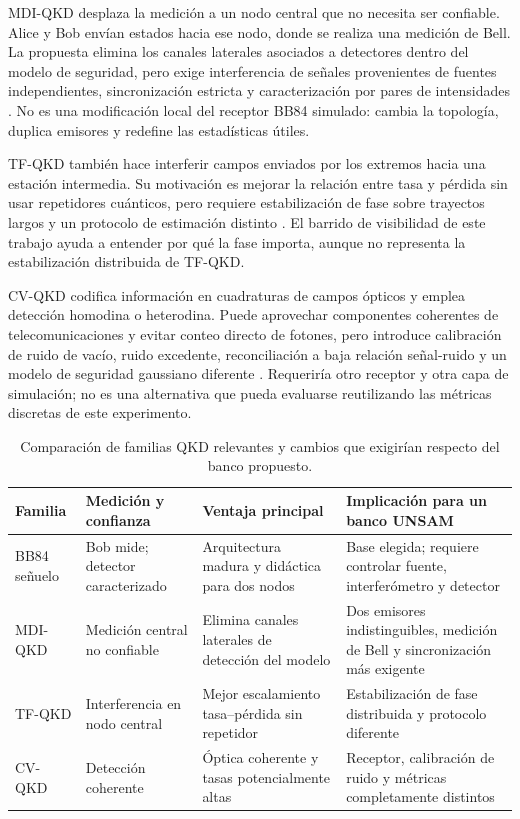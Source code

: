 MDI-QKD desplaza la medición a un nodo central que no necesita ser confiable. Alice y Bob envían estados hacia ese nodo, donde se realiza una medición de Bell. La propuesta elimina los canales laterales asociados a detectores dentro del modelo de seguridad, pero exige interferencia de señales provenientes de fuentes independientes, sincronización estricta y caracterización por pares de intensidades \cite{lo2012mdi}. No es una modificación local del receptor BB84 simulado: cambia la topología, duplica emisores y redefine las estadísticas útiles.

TF-QKD también hace interferir campos enviados por los extremos hacia una estación intermedia. Su motivación es mejorar la relación entre tasa y pérdida sin usar repetidores cuánticos, pero requiere estabilización de fase sobre trayectos largos y un protocolo de estimación distinto \cite{lucamarini2018tf}. El barrido de visibilidad de este trabajo ayuda a entender por qué la fase importa, aunque no representa la estabilización distribuida de TF-QKD.

CV-QKD codifica información en cuadraturas de campos ópticos y emplea detección homodina o heterodina. Puede aprovechar componentes coherentes de telecomunicaciones y evitar conteo directo de fotones, pero introduce calibración de ruido de vacío, ruido excedente, reconciliación a baja relación señal-ruido y un modelo de seguridad gaussiano diferente \cite{grosshans2003cv}. Requeriría otro receptor y otra capa de simulación; no es una alternativa que pueda evaluarse reutilizando las métricas discretas de este experimento.

\begin{table}[H]
  \centering
  \small
  \begin{tabularx}{\textwidth}{
    >{\raggedright\arraybackslash}p{}
    >{\raggedright\arraybackslash}p{}
    >{\raggedright\arraybackslash}p{}
    >{\raggedright\arraybackslash}X}
    \toprule
    Familia & Medición y confianza & Ventaja principal & Implicación para un banco UNSAM \\
    \midrule
    BB84 señuelo & Bob mide; detector caracterizado & Arquitectura madura y didáctica para dos nodos & Base elegida; requiere controlar fuente, interferómetro y detector \\
    MDI-QKD & Medición central no confiable & Elimina canales laterales de detección del modelo & Dos emisores indistinguibles, medición de Bell y sincronización más exigente \\
    TF-QKD & Interferencia en nodo central & Mejor escalamiento tasa--pérdida sin repetidor & Estabilización de fase distribuida y protocolo diferente \\
    CV-QKD & Detección coherente & Óptica coherente y tasas potencialmente altas & Receptor, calibración de ruido y métricas completamente distintos \\
    \bottomrule
  \end{tabularx}
  \caption{Comparación de familias QKD relevantes y cambios que exigirían respecto del banco propuesto.}
  \label{tab:familias_qkd}
\end{table}

